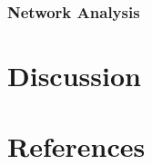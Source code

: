 \documentclass[10pt,twocolumn,twoside,lineno]{pnas-new}
\begin{document}
\subsubsection*{Network Analysis}



\section*{Discussion} \label{sec:discussion}




\section*{References}

\end{document}
